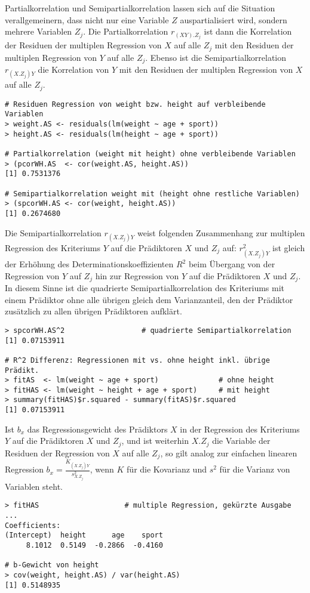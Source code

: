 Partialkorrelation und Semipartialkorrelation lassen sich auf die Situation verallgemeinern, dass nicht nur eine Variable $Z$ auspartialisiert wird, sondern mehrere Variablen $Z_{j}$. Die Partialkorrelation $r_{(XY).Z_{j}}$ ist dann die Korrelation der Residuen der multiplen Regression von $X$ auf alle $Z_{j}$ mit den Residuen der multiplen Regression von $Y$ auf alle $Z_{j}$. Ebenso ist die Semipartialkorrelation $r_{(X.Z_{j})Y}$ die Korrelation von $Y$ mit den Residuen der multiplen Regression von $X$ auf alle $Z_{j}$.
\begin{lstlisting}
# Residuen Regression von weight bzw. height auf verbleibende Variablen
> weight.AS <- residuals(lm(weight ~ age + sport))
> height.AS <- residuals(lm(height ~ age + sport))

# Partialkorrelation (weight mit height) ohne verbleibende Variablen
> (pcorWH.AS  <- cor(weight.AS, height.AS))
[1] 0.7531376

# Semipartialkorrelation weight mit (height ohne restliche Variablen)
> (spcorWH.AS <- cor(weight, height.AS))
[1] 0.2674680
\end{lstlisting}

Die Semipartialkorrelation $r_{(X.Z_{j})Y}$ weist folgenden Zusammenhang zur multiplen Regression des Kriteriums $Y$ auf die Prädiktoren $X$ und $Z_{j}$ auf: $r_{(X.Z_{j})Y}^{2}$ ist gleich der Erhöhung des Determinationskoeffizienten $R^{2}$ beim Übergang von der Regression von $Y$ auf $Z_{j}$ hin zur Regression von $Y$ auf die Prädiktoren $X$ und $Z_{j}$. In diesem Sinne ist die quadrierte Semipartialkorrelation des Kriteriums mit einem Prädiktor ohne alle übrigen gleich dem Varianzanteil, den der Prädiktor zusätzlich zu allen übrigen Prädiktoren aufklärt.
\begin{lstlisting}
> spcorWH.AS^2                  # quadrierte Semipartialkorrelation
[1] 0.07153911

# R^2 Differenz: Regressionen mit vs. ohne height inkl. übrige Prädikt.
> fitAS  <- lm(weight ~ age + sport)              # ohne height
> fitHAS <- lm(weight ~ height + age + sport)     # mit height
> summary(fitHAS)$r.squared - summary(fitAS)$r.squared
[1] 0.07153911
\end{lstlisting}

Ist $b_{x}$ das Regressionsgewicht des Prädiktors $X$ in der Regression des Kriteriums $Y$ auf die Prädiktoren $X$ und $Z_{j}$, und ist weiterhin $X.Z_{j}$ die Variable der Residuen der Regression von $X$ auf alle $Z_{j}$, so gilt analog zur einfachen linearen Regression $b_{x} = \frac{K_{(X.Z_{j})Y}}{s^{2}_{X.Z_{j}}}$, wenn $K$ für die Kovarianz und $s^{2}$ für die Varianz von Variablen steht.
\begin{lstlisting}
> fitHAS                    # multiple Regression, gekürzte Ausgabe ...
Coefficients:
(Intercept)  height      age    sport
     8.1012  0.5149  -0.2866  -0.4160

# b-Gewicht von height
> cov(weight, height.AS) / var(height.AS)
[1] 0.5148935
\end{lstlisting}
